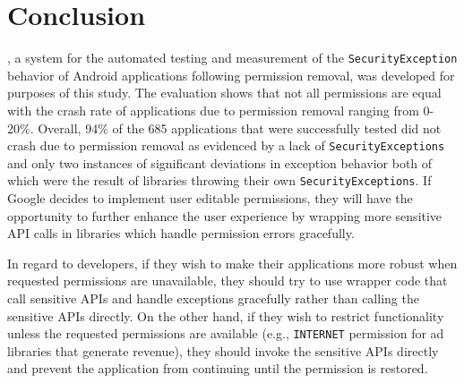 \chapter{Conclusion}
\label{sec:conclusion}

\toolname, a system for the automated testing and measurement of the \texttt{SecurityException} behavior of Android applications following permission removal, was developed for purposes of this study.  The evaluation shows that not all permissions are equal with the crash rate of applications due to permission removal ranging from 0-20\%. Overall, 94\% of the 685 applications that were successfully tested did not crash due to permission removal as evidenced by a lack of \texttt{SecurityExceptions} and only two instances of significant deviations in exception behavior both of which were the result of libraries throwing their own \texttt{SecurityExceptions}.  If Google decides to implement user editable permissions, they will have the opportunity to further enhance the user experience by wrapping more sensitive API calls in libraries which handle permission errors gracefully. 

In regard to developers, if they wish to make their applications more robust when requested permissions are unavailable, they should try to use wrapper code that call sensitive APIs and handle exceptions gracefully rather than calling the sensitive APIs directly.  On the other hand, if they wish to restrict functionality unless the requested permissions are available (e.g., \texttt{INTERNET} permission for ad libraries that generate revenue), they should invoke the sensitive APIs directly and prevent the application from continuing until the permission is restored.
